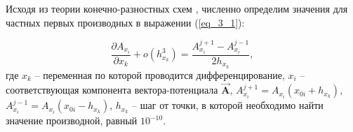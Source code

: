 Исходя из теории конечно-разностных схем \cite{10}, численно определим значения для частных первых производных в выражении (\ref{eq_3_1}):

\begin{equation} \label{eq_3_2}
	\frac{\partial A_{x_i}}{\partial x_k} + o\left(h_{x_k}^3\right) = \frac{A_{x_i}^{j+1} - A_{x_i}^{j-1}}{2h_{x_k}},
\end{equation}
где $x_k$ -- переменная по которой проводится дифференцирование, $x_i$ -- соответствующая компонента вектора-потенциала $\overrightarrow{\textbf{A}}$, $A_{x_i}^{j+1} = A_{x_i}\left(x_{0i} + h_{x_k}\right)$, $A_{x_i}^{j-1} = A_{x_{i}}\left(x_{0i} - h_{x_k}\right)$, $h_{x_k}$ -- шаг от точки, в которой необходимо найти значение производной, равный $10^{-10}$.


